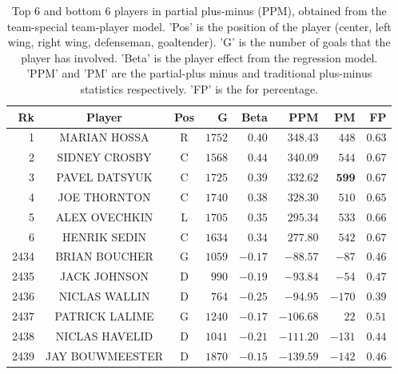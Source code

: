 {
	\renewcommand{\arraystretch}{1.2}
	\begin{table}[htbp]
		\centering
		\begin{tabular}{r c c r r r r r }
			\hline
			Rk & Player & Pos & G & Beta & \textbf{PPM} & PM & FP \\ \hline
			1 & MARIAN HOSSA 			& R & $1752$ & $0.40$ & $348.43$ & $448$ & $0.63$ \\
			2 & SIDNEY CROSBY  		   & C &  $1568$ & $0.44$ & $340.09$ & $544$ & $0.67$ \\
			3 & PAVEL DATSYUK  		   & C &  $1725$ & $0.39$ & $332.62$ & $\mathbf{599}$ & $0.67$ \\
			4 & JOE THORNTON 			& C & $1740$ & $0.38$ & $328.30$ & $510$ & $0.65$ \\
			5 & ALEX OVECHKIN  			& L &  $1705$ & $0.35$ &$295.34$ & $533$ & $0.66$ \\ 
			6 & HENRIK SEDIN   & C & $1634$ & $ 0.34$ & $277.80$ & $542$ & $0.67$ \\ \hline
			2434 & BRIAN BOUCHER   & G & $1059$ & $-0.17$ & $-88.57$  & $-87$ & $0.46$ \\
			2435 &  JACK JOHNSON   		& D  & $990$ & $-0.19$ & $ -93.84$ & $-54$ & $ 0.47$\\
			2436 &  NICLAS WALLIN   		& D  & $764$ & $-0.25$ & $ -94.95$ & $-170$ & $ 0.39$\\
			2437 &  PATRICK LALIME  		& G & $1240$ & $-0.17$ & $ -106.68$ & $ 22$ & $ 0.51$\\
			2438 & NICLAS HAVELID  		& D & $1041$ & $-0.21$ & $ -111.20$ & $-131$ & $ 0.44 $\\
			2439 &  JAY BOUWMEESTER  		& D & $1870$ & $-0.15$ & $ -139.59$ & $-142$ & $ 0.46$\\ \hline
		\end{tabular}
		\caption{Top 6 and bottom 6 players in partial plus-minus (PPM), obtained from the team-special team-player model. 'Pos' is the position of the player (center, left wing, right wing, defenseman, goaltender). 'G' is the number of goals that the player has involved. 'Beta' is the player effect from the regression model. 'PPM' and 'PM' are the partial-plus minus and traditional plus-minus statistics respectively. 'FP' is the for percentage.  }\label{tab:goal.ppm.rank}
	\end{table}
}

